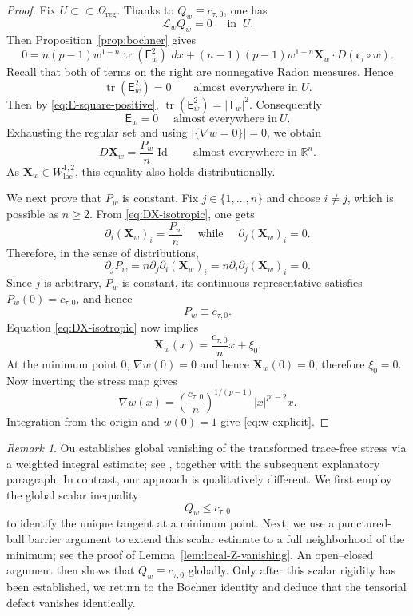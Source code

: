 \documentclass[reqno,12pt]{amsart}
\numberwithin{equation}{section}
\theoremstyle{remark}
\newtheorem{rem}[thm]{Remark}
\newcommand{\R}{\mathbb R}
\newcommand{\dd}{\,d}
\newcommand{\loc}{\mathrm{loc}}
\newcommand{\tr}{\operatorname{tr}}
\newcommand{\Id}{\operatorname{Id}}
\newcommand{\Xbf}{\mathbf X}
\newcommand{\Lscr}{\mathscr L}
\begin{document}
\begin{proof}
Fix $U\subset\subset\Omega_{\mathrm{reg}}$.
Thanks to $Q_w\equiv c_{\tau,0}$, one has
$$\Lscr_w Q_w=0 \quad \text{ in }\ U.$$
Then Proposition~\ref{prop:bochner}  gives
$$
0= n(p-1)w^{1-n}\tr(\mathsf E_w^2)\,\dd x +
(n-1)(p-1)w^{1-n} \Xbf_w\cdot D(\mathfrak e_\tau\circ w).
$$
Recall that both of terms on the right are nonnegative Radon measures. Hence
$$
 \tr(\mathsf E_w^2)=0 \qquad\text{almost everywhere in }U.
$$
Then by \eqref{eq:E-square-positive},
$\tr(\mathsf E_w^2)=|\mathsf T_w|^2$. Consequently
$$\mathsf E_w=0 \quad \text{ almost everywhere in} \ U.$$
Exhausting the regular set and using
$|\{\nabla w=0\}|=0$, we obtain
\begin{equation}\label{eq:DX-isotropic}
D\Xbf_w=\frac{P_w}{n}\Id \qquad\text{almost everywhere in }\R^n.
\end{equation}
As $\Xbf_w\in W^{1,2}_{\loc}$, this equality also holds
distributionally.

We next prove that $P_w$ is constant.
Fix $j\in\{1,\dots,n\}$ and choose $i\ne j$, which is possible as $n\ge2$. From \eqref{eq:DX-isotropic}, one gets
$$
\partial_i(\Xbf_w)_i=\frac{P_w}{n} \quad \text{ while } \quad \partial_j(\Xbf_w)_i=0.
$$
Therefore, in the sense of distributions,
$$
\partial_j P_w = n\partial_j\partial_i(\Xbf_w)_i =
n\partial_i\partial_j(\Xbf_w)_i =0.
$$
Since $j$ is arbitrary, $P_w$ is constant, its continuous representative satisfies $P_w(0)=c_{\tau,0}$, and hence
\begin{equation}\label{eq:P-constant}
P_w\equiv c_{\tau,0}.
\end{equation}
Equation \eqref{eq:DX-isotropic} now implies
$$
\Xbf_w(x)=\frac{c_{\tau,0}}n x+\xi_0.
$$
At the minimum point $0$, $\nabla w(0)=0$ and hence
$\Xbf_w(0)=0$; therefore $\xi_0=0$.  Now inverting the stress map gives
$$
\nabla w(x) =\left(\frac{c_{\tau,0}}n\right)^{1/(p-1)}
  |x|^{p'-2}x.
$$
Integration from the origin and $w(0)=1$ give
\eqref{eq:w-explicit}.
\end{proof}

\begin{rem} \label{rem:ou-closure-comparison}
Ou establishes global vanishing of the transformed trace-free stress via a weighted integral estimate; see \cite[equation~(3.34)]{O2025}, together with the subsequent explanatory paragraph. In contrast, our approach is qualitatively different. We first employ the global scalar inequality
$$
Q_w \le c_{\tau,0}
$$
to identify the unique tangent at a minimum point. Next, we use a punctured-ball barrier argument to extend this scalar estimate to a full neighborhood of the minimum; see the proof of Lemma~\ref{lem:local-Z-vanishing}. An open–closed argument then shows that $Q_w \equiv c_{\tau,0}$ globally. Only after this scalar rigidity has been established,  we return to the Bochner identity and deduce that the tensorial defect vanishes identically.
\end{rem}
\end{document}
